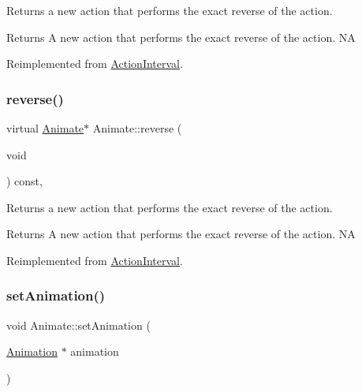Returns a new action that performs the exact reverse of the action.

\begin{DoxyReturn}{Returns}
A new action that performs the exact reverse of the action.  NA 
\end{DoxyReturn}


Reimplemented from \hyperlink{classActionInterval_a9f9ac7164036a0bc261a72f62a2b2da7}{Action\+Interval}.

\mbox{\label{classAnimate_a199fd586e88f3560c2b1cb1c3f18b04f}} 
\subsubsection{\texorpdfstring{reverse()}{reverse()}\hspace{0.1cm}{\footnotesize\ttfamily [2/2]}}
{\footnotesize\ttfamily virtual \hyperlink{classAnimate}{Animate}$\ast$ Animate\+::reverse (\begin{DoxyParamCaption}\item[{void}]{ }\end{DoxyParamCaption}) const\hspace{0.3cm}{\ttfamily [override]}, {\ttfamily [virtual]}}

Returns a new action that performs the exact reverse of the action.

\begin{DoxyReturn}{Returns}
A new action that performs the exact reverse of the action.  NA 
\end{DoxyReturn}


Reimplemented from \hyperlink{classActionInterval_a9f9ac7164036a0bc261a72f62a2b2da7}{Action\+Interval}.

\mbox{\label{classAnimate_a041aefb7a2f9398a962bb9b37888af05}} 
\subsubsection{\texorpdfstring{set\+Animation()}{setAnimation()}\hspace{0.1cm}{\footnotesize\ttfamily [1/2]}}
{\footnotesize\ttfamily void Animate\+::set\+Animation (\begin{DoxyParamCaption}\item[{\hyperlink{classAnimation}{Animation} $\ast$}]{animation }\end{DoxyParamCaption})}

